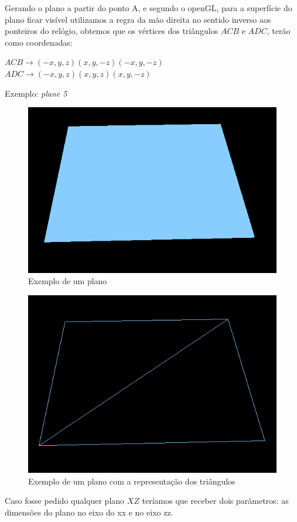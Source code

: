 \documentclass[12pt]{article}
\begin{document}
Gerando o plano a partir do ponto A, e segundo o openGL, para a superfície do plano ficar visível utilizamos a regra da mão direita no sentido inverso aos ponteiros do relógio,
obtemos que os vértices dos triângulos $ACB$ e $ADC$, terão como coordenadas: \newline
\begin{center}
$ACB\rightarrow (-x,y,z) (x,y,-z) (-x,y,-z) $ \newline
$ADC\rightarrow (-x,y,z) (x,y,z) (x,y,-z)$ \newline
\end{center}
Exemplo: \textit{plane 5}
\begin{figure}[H]
\centering\includegraphics[scale=0.45]{planoP} 
\caption{\label{fig:controller}Exemplo de um plano}
\end{figure} \begin{figure}[H]
\centering\includegraphics[scale=0.45]{planoT} 
\caption{\label{fig:controller}Exemplo de um plano com a representação dos triângulos}
\end{figure} 
Caso fosse pedido qualquer plano $XZ$ teríamos que receber dois parâmetros: as dimensões do plano no eixo do xx e no eixo zz. 
\newpage
\end{document}
